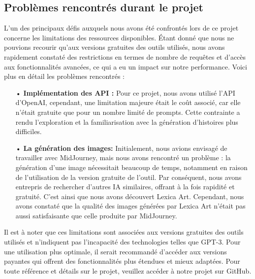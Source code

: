 \documentclass[11,5pt]{report}
\begin{document}
\begin{spacing}{2}
\cleardoublepage

\section{Problèmes rencontrés durant le projet}
\begin{spacing}{2}
\par 
L'un des principaux défis auxquels nous avons été confrontés lors de ce projet concerne les limitations des ressources disponibles. Étant donné que nous ne pouvions recourir qu’aux versions gratuites des outils utilisés, nous avons rapidement constaté des restrictions en termes de nombre de requêtes et d'accès aux fonctionnalités avancées, ce qui a eu un impact sur notre performance. Voici plus en détail les problèmes rencontrés :

\begin{itemize}
\item[•] \textbf{Implémentation des API :} Pour ce projet, nous avons utilisé l'API d'OpenAI\cite{OpenAIDocs}, cependant, une limitation majeure était le coût associé, car elle n'était  gratuite que pour un nombre limité de prompts. Cette contrainte a rendu l'exploration et la familiarisation avec la génération d'histoires plus difficiles. 
\item[•] \textbf{La génération des images:} Initialement, nous avions envisagé de travailler avec MidJourney, mais nous avons rencontré un problème : la génération d'une image nécessitait beaucoup de temps, notamment en raison de l'utilisation de la version gratuite de l'outil. Par conséquent, nous avons entrepris de rechercher d'autres IA similaires, offrant à la fois rapidité et gratuité. C'est ainsi que nous avons découvert Lexica Art\cite{Lexica}. Cependant, nous avons constaté que la qualité des images générées par Lexica Art\cite{Lexica} n'était pas aussi satisfaisante que celle produite par MidJourney.
\end{itemize}

\par
Il est à noter que ces limitations sont associées aux versions gratuites des outils utilisés et n’indiquent pas l’incapacité des technologies telles que GPT-3. Pour une utilisation plus optimale, il serait recommandé d'accéder aux versions payantes qui offrent des fonctionnalités plus étendues et mieux adaptées. Pour toute référence et détails sur le projet, veuillez accéder à notre projet sur GitHub. 



\end{spacing}
\end{spacing}
\end{document}
